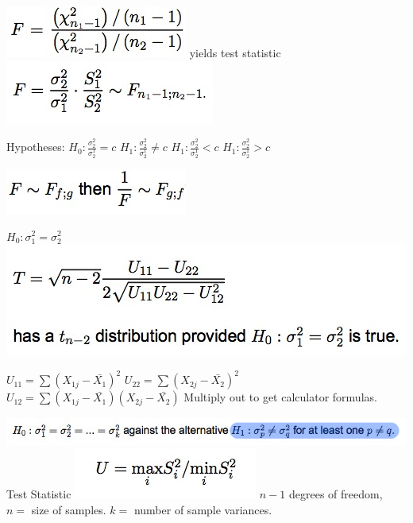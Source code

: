 \documentclass{examnotes}
\begin{document}
\includegraphics[scale=0.5]{./img/derf.jpg}
yields test statistic
\includegraphics[scale=0.5]{./img/fstat.jpg} 

Hypotheses:
$H_0: \frac{\sigma^2_2}{\sigma^1_2} = c$
$H_1: \frac{\sigma^2_2}{\sigma^1_2} \ne c$
$H_1: \frac{\sigma^2_2}{\sigma^1_2} < c$
$H_1: \frac{\sigma^2_2}{\sigma^1_2} > c$

\includegraphics[scale=0.5]{./img/invf.jpg}

$H_0: \sigma^2_1=\sigma^2_2$
\includegraphics[scale=0.5]{./img/r61.jpg}

$U_{11}=\sum(X_{1j}-\bar{X_1})^2$
$U_{22}=\sum(X_{2j}-\bar{X_2})^2$
$U_{12}=\sum(X_{1j}-\bar{X_1})(X_{2j}-\bar{X_2})$
Multiply out to get calculator formulas.


\includegraphics[scale=0.5]{./img/64hyp.jpg}
Test Statistic
\includegraphics[scale=0.5]{./img/64ts.jpg}
$n-1$ degrees of freedom, $n=$ size of samples.
$k=$ number of sample variances.
\end{document}
